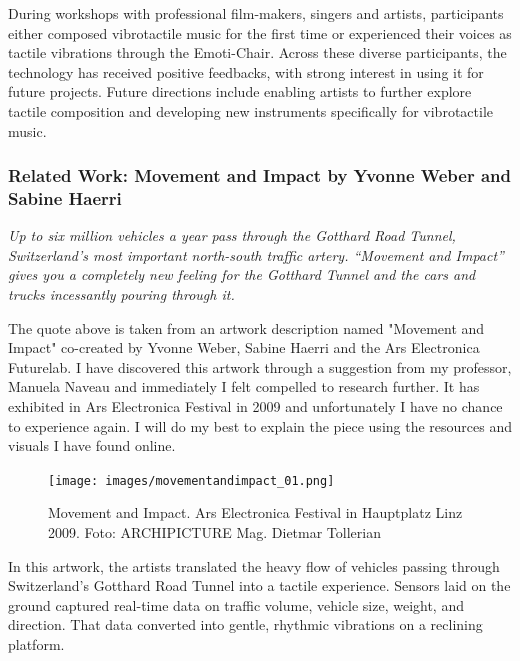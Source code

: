                 During workshops with professional film-makers, singers and artists, participants either composed vibrotactile music for the first time or experienced their voices as tactile vibrations through the Emoti-Chair. Across these diverse participants, the technology has received positive feedbacks, with strong interest in using it for future projects. Future directions include enabling artists to further explore tactile composition and developing new instruments specifically for vibrotactile music.\par
            \subsubsection{Related Work: Movement and Impact by Yvonne Weber and Sabine Haerri}
                \emph{Up to six million vehicles a year pass through the Gotthard Road Tunnel, Switzerland's most important north-south traffic artery. “Movement and Impact” gives you a completely new feeling for the Gotthard Tunnel and the cars and trucks incessantly pouring through it.\cite{Movement_and_Impact_ARS}}

                The quote above is taken from an artwork description named "Movement and Impact" co-created by Yvonne Weber, Sabine Haerri and the Ars Electronica Futurelab. I have discovered this artwork through a suggestion from my professor, Manuela Naveau and immediately I felt compelled to research further. It has exhibited in Ars Electronica Festival in 2009 and unfortunately I have no chance to experience again. I will do my best to explain the piece using the resources and visuals I have found online.\par

                \begin{figure}[H]
                    \centering
                    \texttt{[image: images/movementandimpact\_01.png]}
                    \caption{Movement and Impact. Ars Electronica Festival in Hauptplatz Linz 2009. Foto: ARCHIPICTURE Mag. Dietmar Tollerian}
                    \label{fig:MOVNIMP}
                \end{figure}   

                In this artwork, the artists translated the heavy flow of vehicles passing through Switzerland's Gotthard Road Tunnel into a tactile experience. Sensors laid on the ground captured real-time data on traffic volume, vehicle size, weight, and direction. That data converted into gentle, rhythmic vibrations on a reclining platform\cite{Movement_and_Impact_ARS}.\par


